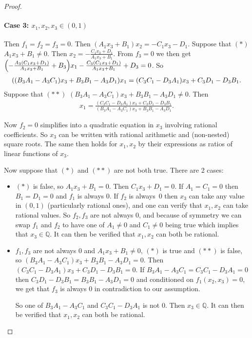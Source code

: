 \documentclass[preprint,12pt,authoryear]{elsarticle}
\newcommand{\Q}{\mathbb{Q}}
\DeclarePairedDelimiter{\iop}{(}{)}
\newcommand{\p}{\iop*}
\begin{document}
\begin{proof}
  \paragraph{Case 3: $x_1,x_2,x_3\in(0,1)$} Then $f_1=f_2=f_3=0$.
  Then $(A_1x_3+B_1)x_2=-C_1x_3-D_1$. Suppose that $(*)$ $A_1x_3+B_1\ne0$. Then 
  $x_2=-\frac{C_1x_3+D_1}{A_1x_3+B_1}$. From $f_3=0$ we then get 
  $\p{-\frac{A_3(C_1x_3+D_1)}{A_1x_3+B_1}+B_3}x_1-\frac{C_3(C_1x_3+D_1)}{A_1x_3+B_1}+D_3=0$.  
  So
  \begin{align*}
    \p{(B_3A_1-A_3C_1)x_3+B_3B_1-A_3D_1}x_1=(C_3C_1-D_3A_1)x_3+C_3D_1-D_3B_1.
  \end{align*}
  Suppose that $(**)$ $(B_3A_1-A_3C_1)x_3+B_3B_1-A_3D_1\ne0$. Then
  \begin{align*}
    x_1=\frac{(C_3C_1-D_3A_1)x_3+C_3D_1-D_3B_1}{(B_3A_1-A_3C_1)x_3+B_3B_1-A_3D_1}.
  \end{align*}
  
  Now $f_2=0$ simplifies into a quadratic equation in $x_3$ involving rational 
  coefficients.
  So $x_3$ can be written with rational arithmetic and (non-nested) square roots. The same then holds for $x_1,x_2$ by their expressions as ratios of linear 
  functions of $x_3$.

  Now suppose that $(*)$ and $(**)$ are not both true. There are 2 cases:
  \begin{itemize}
    \item $(*)$ is false, so $A_1x_3+B_1=0$. Then $C_1x_3+D_1=0$. If 
      $A_1=C_1=0$ then $B_1=D_1=0$ and $f_1$ is always $0$. If $f_2$ is always~$0$ then 
      $x_3$ can take any value in $(0,1)$ (particularly rational ones), and one can verify 
      that $x_1,x_2$ can take rational values. So $f_2,f_3$ are not always $0$, and because 
      of symmetry we can swap $f_1$ and $f_2$ to have one of $A_1\ne0$ and $C_1\ne0$ being 
      true which implies that $x_3\in\Q$. It can then be verified that $x_1,x_2$ can both 
      be rational.

    \item $f_1,f_3$ are not always $0$ and $A_1x_3+B_1\ne0$, $(*)$ is true and $(**)$ is false, so $(B_3A_1-A_3C_1)x_3+B_3B_1-A_3D_1=0$. Then 
      $(C_3C_1-D_3A_1)x_3+C_3D_1-D_3B_1=0$. If $B_3A_1-A_3C_1=C_3C_1-D_3A_1=0$ then 
      $C_3D_1-D_3B_1=B_3B_1-A_3D_1=0$ and conditioned on $f_1(x_2,x_3)=0$, we get that 
      $f_3$ is always $0$ in contradiction to our assumption.

      So one of $B_3A_1-A_3C_1$ and $C_3C_1-D_3A_1$ is not $0$. Then $x_3\in\Q$. It can 
      then be verified that $x_1,x_2$ can both be rational. \qedhere
  \end{itemize}
\end{proof}
\end{document}
